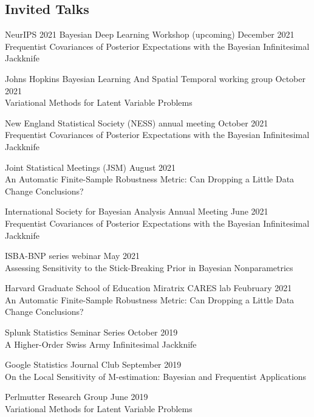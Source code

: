 \documentclass[margin,line]{res}
\begin{document}
\begin{resume}
\clearpage
\section{\sc Invited Talks}

NeurIPS 2021 Bayesian Deep Learning Workshop
\hfill (upcoming) December 2021 \\
Frequentist Covariances of Posterior Expectations
with the Bayesian Infinitesimal Jackknife


Johns Hopkins Bayesian Learning And Spatial Temporal working group
\hfill October 2021\\
Variational Methods for Latent Variable Problems

New England Statistical Society (NESS) annual meeting
\hfill October 2021\\
Frequentist Covariances of Posterior Expectations
with the Bayesian Infinitesimal Jackknife

Joint Statistical Meetings (JSM)
\hfill August 2021\\
An Automatic Finite-Sample Robustness Metric: Can Dropping a Little Data
Change Conclusions?

International Society for Bayesian Analysis Annual Meeting
\hfill June 2021\\
Frequentist Covariances of Posterior Expectations
with the Bayesian Infinitesimal Jackknife

ISBA-BNP series webinar %
\hfill May 2021\\
Assessing Sensitivity to the Stick-Breaking Prior in Bayesian Nonparametrics

Harvard Graduate School of Education Miratrix CARES lab
\hfill Feubruary 2021\\
An Automatic Finite-Sample Robustness Metric: Can Dropping a Little Data
Change Conclusions?

Splunk Statistics Seminar Series \hfill October 2019\\
A Higher-Order Swiss Army Infinitesimal Jackknife

Google Statistics Journal Club \hfill September 2019\\
On the Local Sensitivity of M-estimation: Bayesian and Frequentist Applications

Perlmutter Research Group \hfill June 2019 \\
Variational Methods for Latent Variable Problems


\end{resume}
\end{document}
